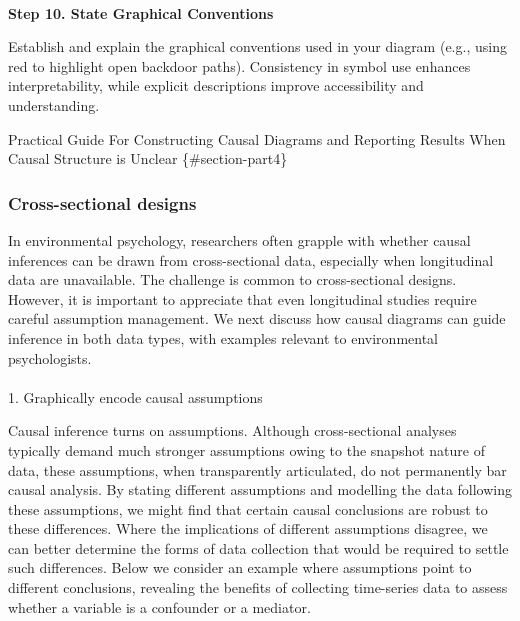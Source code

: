 \documentclass[
  single column]{article}
\makeatletter
\let\oldparagraph\paragraph
\renewcommand{\paragraph}{
    \@ifstar
      \xxxParagraphStar
      \xxxParagraphNoStar
  }
\newcommand{\xxxParagraphStar}[1]{\oldparagraph*{#1}\mbox{}}
\newcommand{\xxxParagraphNoStar}[1]{\oldparagraph{#1}\mbox{}}
\makeatother
\begin{document}
\paragraph{\texorpdfstring{\textbf{Step 10. State Graphical
Conventions}}{Step 10. State Graphical Conventions}}\label{step-10.-state-graphical-conventions}

Establish and explain the graphical conventions used in your diagram
(e.g., using red to highlight open backdoor paths). Consistency in
symbol use enhances interpretability, while explicit descriptions
improve accessibility and understanding.

Practical Guide For Constructing Causal Diagrams and Reporting Results
When Causal Structure is Unclear \{\#section-part4\}

\subsubsection{Cross-sectional designs}\label{cross-sectional-designs}

In environmental psychology, researchers often grapple with whether
causal inferences can be drawn from cross-sectional data, especially
when longitudinal data are unavailable. The challenge is common to
cross-sectional designs. However, it is important to appreciate that
even longitudinal studies require careful assumption management. We next
discuss how causal diagrams can guide inference in both data types, with
examples relevant to environmental psychologists.

\paragraph{1. Graphically encode causal
assumptions}\label{graphically-encode-causal-assumptions}

Causal inference turns on assumptions. Although cross-sectional analyses
typically demand much stronger assumptions owing to the snapshot nature
of data, these assumptions, when transparently articulated, do not
permanently bar causal analysis. By stating different assumptions and
modelling the data following these assumptions, we might find that
certain causal conclusions are robust to these differences. Where the
implications of different assumptions disagree, we can better determine
the forms of data collection that would be required to settle such
differences. Below we consider an example where assumptions point to
different conclusions, revealing the benefits of collecting time-series
data to assess whether a variable is a confounder or a mediator.
\end{document}
